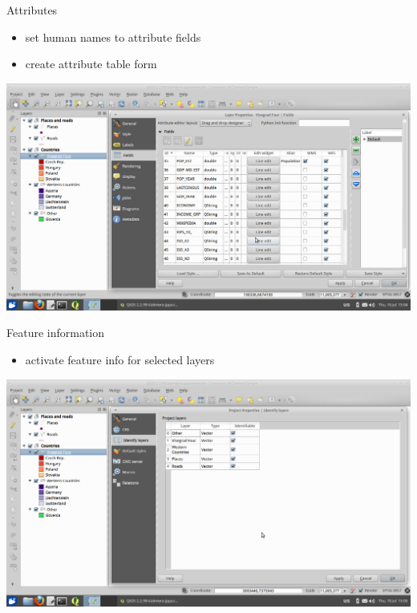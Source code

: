\documentclass[12pt]{beamer}
\begin{document}
\begin{frame}{Attributes}
	\begin{itemize}
		\item set human names to attribute fields
		\item create attribute table form
	\end{itemize}
	\begin{center}
		\includegraphics[keepaspectratio=true,height=0.6\textheight]{images/rapid-gis-deployment/project-layer-attributes.png}
	\end{center}
\end{frame}


\begin{frame}{Feature information}
	\begin{itemize}
		\item activate feature info for selected layers
	\end{itemize}
	\begin{center}
		\includegraphics[keepaspectratio=true,height=0.6\textheight]{images/rapid-gis-deployment/project-feature-info.png}
	\end{center}
\end{frame}
\end{document}
